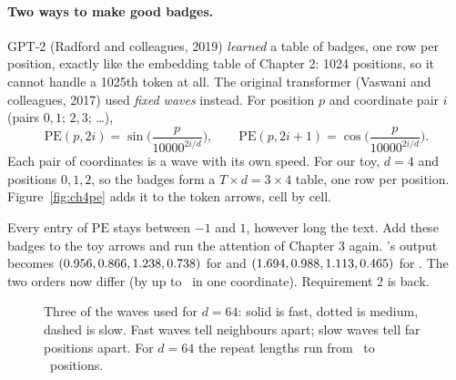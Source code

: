 \paragraph{Two ways to make good badges.} GPT-2 (Radford and colleagues, 2019) \emph{learned} a table of
badges, one row per position, exactly like the embedding table of Chapter 2: 1024 positions, so it
cannot handle a 1025th token at all. The original transformer (Vaswani and colleagues, 2017) used
\emph{fixed waves} instead. For position $p$ and coordinate pair $i$ (pairs $0,1$; $2,3$; \ldots),
\[
\mathrm{PE}(p, 2i) = \sin\!\Big(\frac{p}{10000^{2i/d}}\Big), \qquad
\mathrm{PE}(p, 2i+1) = \cos\!\Big(\frac{p}{10000^{2i/d}}\Big).
\]
Each pair of coordinates is a wave with its own speed. For our toy, $d=4$ and positions $0,1,2$, so
the badges form a $T\times d = 3\times4$ table, one row per position. Figure~\ref{fig:ch4pe} adds it to
the token arrows, cell by cell.

\begin{center}
\fitwidthFourFive{}
\label{fig:ch4pe}
\end{center}

Every entry of $\mathrm{PE}$ stays between $-1$ and $1$, however long the text. Add these badges to the toy arrows and run
the attention of Chapter 3 again. 's output becomes $(0.956, 0.866, 1.238, 0.738)$ for  and
$(1.694, 0.988, 1.113, 0.465)$ for . The two orders now differ (by up to \nFourSinDiff\ in one
coordinate). Requirement 2 is back.

\begin{figure}[h]
\centering
{}
\caption{Three of the waves used for $d=64$: solid is fast, dotted is medium, dashed is slow. Fast waves tell neighbours apart; slow waves tell far
positions apart. For $d=64$ the repeat lengths run from \nFourWlMin\ to \nFourWlMax\ positions.}
\end{figure}

